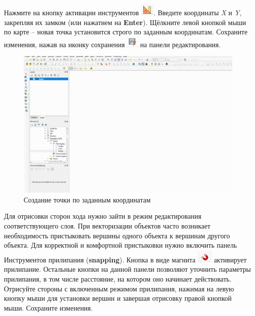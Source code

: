 \documentclass[
  12pt,
]{book}
\begin{document}
Нажмите на кнопку активации инструментов \includegraphics{images/Practice/Enable_Advanced.png}. Введите координаты \emph{X} и \emph{Y}, закрепляя их замком (или нажатием на \textbf{Enter}). Щёлкните левой кнопкой мыши по карте -- новая точка установится строго по заданным координатам. Сохраните изменения, нажав на иконку сохранения \includegraphics{images/Practice/Save_edits.png} на панели редактирования.

\begin{figure}
\centering
\includegraphics{images/Practice/Coordinate_input.gif}
\caption{Создание точки по заданным координатам}
\end{figure}

Для отрисовки сторон хода нужно зайти в режим редактирования соответствующего слоя. При векторизации объектов часто возникает необходимость пристыковать вершины одного объекта к вершинам другого объекта. Для корректной и комфортной пристыковки нужно включить панель Инструментов прилипания (\textbf{snapping}). Кнопка в виде магнита \includegraphics{images/Practice/Snapping.png} активирует прилипание. Остальные кнопки на данной панели позволяют уточнить параметры прилипания, в том числе расстояние, на котором оно начинает действовать. Отрисуйте стороны с включенным режимом прилипания, нажимая на левую кнопку мыши для установки вершин и завершая отрисовку правой кнопкой мыши. Сохраните изменения.
\end{document}
